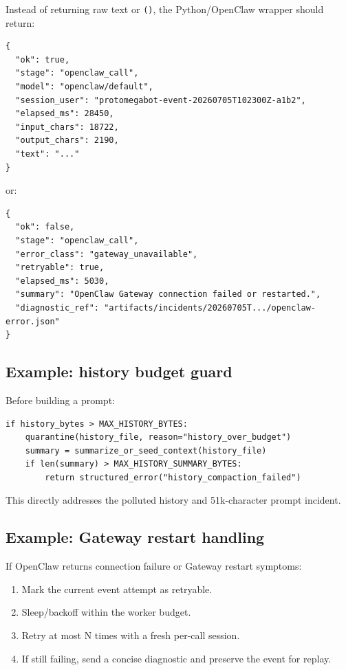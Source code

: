 \documentclass[11pt]{article}
\begin{document}
Instead of returning raw text or \texttt{()}, the Python/OpenClaw wrapper should return:

\begin{Verbatim}[fontsize=\small]
{
  "ok": true,
  "stage": "openclaw_call",
  "model": "openclaw/default",
  "session_user": "protomegabot-event-20260705T102300Z-a1b2",
  "elapsed_ms": 28450,
  "input_chars": 18722,
  "output_chars": 2190,
  "text": "..."
}
\end{Verbatim}

or:

\begin{Verbatim}[fontsize=\small]
{
  "ok": false,
  "stage": "openclaw_call",
  "error_class": "gateway_unavailable",
  "retryable": true,
  "elapsed_ms": 5030,
  "summary": "OpenClaw Gateway connection failed or restarted.",
  "diagnostic_ref": "artifacts/incidents/20260705T.../openclaw-error.json"
}
\end{Verbatim}

\subsection{Example: history budget guard}

Before building a prompt:

\begin{Verbatim}[fontsize=\small]
if history_bytes > MAX_HISTORY_BYTES:
    quarantine(history_file, reason="history_over_budget")
    summary = summarize_or_seed_context(history_file)
    if len(summary) > MAX_HISTORY_SUMMARY_BYTES:
        return structured_error("history_compaction_failed")
\end{Verbatim}

This directly addresses the polluted history and 51k-character prompt incident.

\subsection{Example: Gateway restart handling}

If OpenClaw returns connection failure or Gateway restart symptoms:

\begin{enumerate}
  \item Mark the current event attempt as retryable.
  \item Sleep/backoff within the worker budget.
  \item Retry at most N times with a fresh per-call session.
  \item If still failing, send a concise diagnostic and preserve the event for replay.
\end{enumerate}
\end{document}
